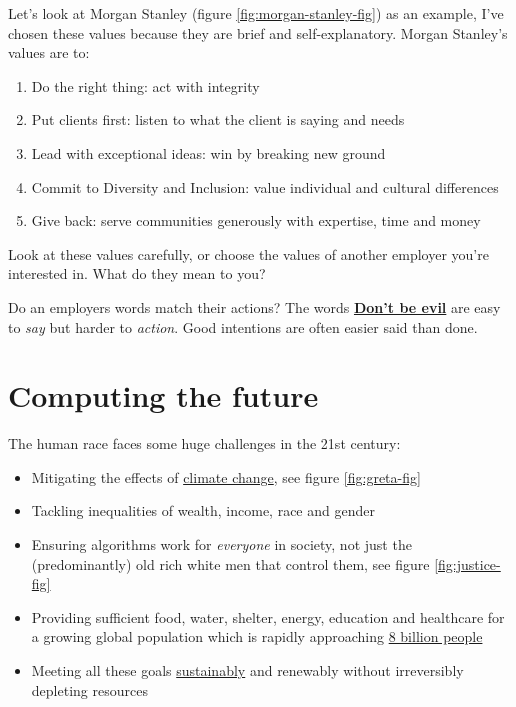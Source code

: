 \documentclass[
]{book}
\providecommand{\tightlist}{%
  \setlength{\itemsep}{0pt}\setlength{\parskip}{0pt}}
\begin{document}
Let's look at Morgan Stanley (figure \ref{fig:morgan-stanley-fig}) as an example, I've chosen these values because they are brief and self-explanatory. Morgan Stanley's values are to:

\begin{enumerate}
\def\labelenumi{\arabic{enumi}.}
\tightlist
\item
  Do the right thing: act with integrity
\item
  Put clients first: listen to what the client is saying and needs
\item
  Lead with exceptional ideas: win by breaking new ground
\item
  Commit to Diversity and Inclusion: value individual and cultural differences
\item
  Give back: serve communities generously with expertise, time and money
\end{enumerate}

Look at these values carefully, or choose the values of another employer you're interested in. What do they mean to you?

Do an employers words match their actions? The words \textbf{\href{https://en.wikipedia.org/wiki/Don\%27t_be_evil}{Don't be evil}} are easy to \emph{say} but harder to \emph{action}. Good intentions are often easier said than done.

\hypertarget{betterplace}{%
\section{Computing the future}\label{betterplace}}

The human race faces some huge challenges in the 21st century:

\begin{itemize}
\tightlist
\item
  Mitigating the effects of \href{https://en.wikipedia.org/wiki/Climate_change}{climate change}, see figure \ref{fig:greta-fig}
\item
  Tackling inequalities of wealth, income, race and gender \citep{stanley}
\item
  Ensuring algorithms work for \emph{everyone} in society, not just the (predominantly) old rich white men that control them, see figure \ref{fig:justice-fig}
\item
  Providing sufficient food, water, shelter, energy, education and healthcare for a growing global population which is rapidly approaching \href{https://www.worldometers.info/world-population/}{8 billion people}
\item
  Meeting all these goals \href{https://en.wikipedia.org/wiki/Sustainability}{sustainably} and renewably without irreversibly depleting resources
\end{itemize}
\end{document}
